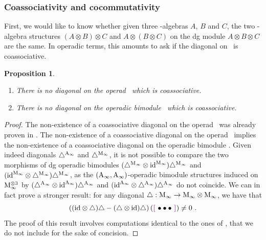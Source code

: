 \documentclass[10pt]{amsart}
\newtheorem{proposition}[definition]{Proposition}
\theoremstyle{remark}
\begin{document}
\subsubsection{Coassociativity and cocommutativity} \label{sss:coassoc-cocomm}

First, we would like to know whether given three \Ainf -algebras $A$, $B$ and $C$, the two \Ainf -algebra structures $( A \otimes B) \otimes C$ and $A \otimes ( B \otimes C)$ on the dg module $A \otimes B \otimes C$ are the same. 
In operadic terms, this amounts to ask if the diagonal on \Ainf\ is coassociative.

\begin{proposition} $ $
  \label{prop:nocoassoc}
  \begin{enumerate}[leftmargin=*]
  \item There is no diagonal on the operad \Ainf\ which is coassociative. 
  \item There is no diagonal on the operadic bimodule \Minf\ which is coassociative.
  \end{enumerate}
\end{proposition} 

\begin{proof}
The non-existence of a coassociative diagonal on the operad \Ainf\ was already proven in \cite[Section 6]{MarklShnider06}.
The non-existence of a coassociative diagonal on the operad \Ainf\ implies the non-existence of a coassociative diagonal on the operadic bimodule \Minf . 
Given indeed diagonals $\triangle^{\mathrm{A}_\infty}$ and $\triangle^{\mathrm{M}_\infty}$, it is not possible to compare the two morphisms of dg operadic bimodules $ ( \triangle^{\mathrm{M}_\infty} \otimes \mathrm{id}^{\mathrm{M}_\infty} ) \triangle^{\mathrm{M}_\infty}$ and $(\mathrm{id}^{\mathrm{M}_\infty} \otimes \triangle^{\mathrm{M}_\infty} )\triangle^{\mathrm{M}_\infty}$, as the $(\mathrm{A}_\infty , \mathrm{A}_\infty)$-operadic bimodule structures induced on $\mathrm{M}_\infty^{\otimes 3}$ by $ ( \triangle^{\mathrm{A}_\infty} \otimes \mathrm{id}^{\mathrm{A}_\infty} ) \triangle^{\mathrm{A}_\infty}$ and $(\mathrm{id}^{\mathrm{A}_\infty} \otimes \triangle^{\mathrm{A}_\infty} ) \triangle^{\mathrm{A}_\infty}$ do not coincide.
We can in fact prove a stronger result:  for any diagonal $\triangle : \mathrm{M}_\infty \to \mathrm{M}_\infty \otimes \mathrm{M}_\infty$, we have that
\[ \left( (\ide \otimes \triangle ) \triangle - (\triangle \otimes \ide) \triangle \right) \left( \purple{\bullet \bullet \bullet} \right) \neq 0 \ . \]
The proof of this result involves computations identical to the ones of \cite[Section 6]{MarklShnider06}, that we do not include for the sake of concision. 
\end{proof}
\end{document}
